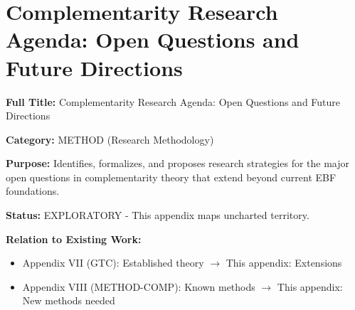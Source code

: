 
\chapter{Complementarity Research Agenda: Open Questions and Future Directions}
\label{app:method-research}

\begin{tcolorbox}[colback=purple!5!white,colframe=purple!75!black,title=\textbf{Appendix IX: METHOD-RESEARCH}]
\textbf{Full Title:} Complementarity Research Agenda: Open Questions and Future Directions

\textbf{Category:} METHOD (Research Methodology)

\textbf{Purpose:} Identifies, formalizes, and proposes research strategies for the major open questions in complementarity theory that extend beyond current EBF foundations.

\textbf{Status:} EXPLORATORY - This appendix maps uncharted territory.

\textbf{Relation to Existing Work:}
\begin{itemize}[noitemsep]
    \item Appendix VII (GTC): Established theory $\to$ This appendix: Extensions
    \item Appendix VIII (METHOD-COMP): Known methods $\to$ This appendix: New methods needed
\end{itemize}
\end{tcolorbox}

